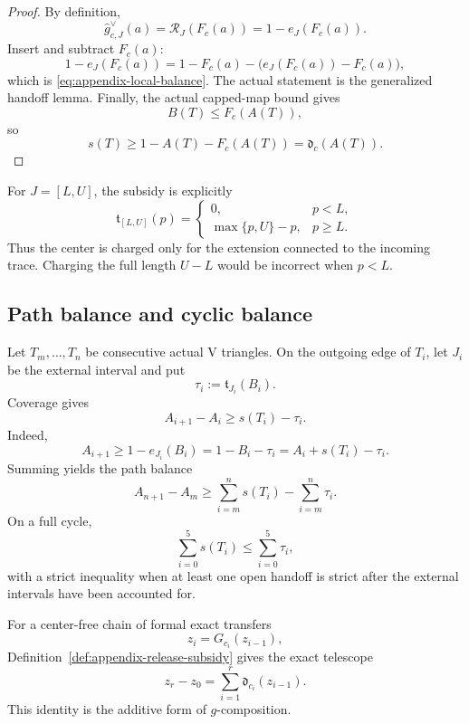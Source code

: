 \begin{proof}
By definition,
\[
 \widehat g_{c,J}^\vee(a)
 =\mathcal R_J(F_c(a))
 =1-e_J(F_c(a)).
\]
Insert and subtract \(F_c(a)\):
\[
 1-e_J(F_c(a))
 =1-F_c(a)-\bigl(e_J(F_c(a))-F_c(a)\bigr),
\]
which is \eqref{eq:appendix-local-balance}.  The actual statement is the
generalized handoff lemma.  Finally, the actual capped-map bound gives
\[
 B(T)\le F_c(A(T)),
\]
so
\[
 s(T)
 \ge1-A(T)-F_c(A(T))
 =\mathfrak d_c(A(T)).
\]
\end{proof}

For \(J=[L,U]\), the subsidy is explicitly
\begin{equation}
 \mathfrak t_{[L,U]}(p)=
 \begin{cases}
 0,&p<L,\\
 \max\{p,U\}-p,&p\ge L.
 \end{cases}
 \label{eq:appendix-subsidy-explicit}
\end{equation}
Thus the center is charged only for the extension connected to the incoming
trace.  Charging the full length \(U-L\) would be incorrect when \(p<L\).

\subsection{Path balance and cyclic balance}

Let \(T_m,\ldots,T_n\) be consecutive actual V triangles.  On the outgoing
edge of \(T_i\), let \(J_i\) be the external interval and put
\[
 \tau_i:=\mathfrak t_{J_i}(B_i).
\]
Coverage gives
\begin{equation}
 A_{i+1}-A_i
 \ge s(T_i)-\tau_i.
 \label{eq:appendix-signed-step}
\end{equation}
Indeed,
\[
 A_{i+1}\ge1-e_{J_i}(B_i)
 =1-B_i-\tau_i
 =A_i+s(T_i)-\tau_i.
\]
Summing yields the path balance
\begin{equation}
 A_{n+1}-A_m
 \ge\sum_{i=m}^n s(T_i)-\sum_{i=m}^n\tau_i.
 \label{eq:appendix-path-balance}
\end{equation}
On a full cycle,
\begin{equation}
 \sum_{i=0}^5s(T_i)
 \le\sum_{i=0}^5\tau_i,
 \label{eq:appendix-cycle-balance}
\end{equation}
with a strict inequality when at least one open handoff is strict after the
external intervals have been accounted for.

For a center-free chain of formal exact transfers
\[
 z_i=G_{c_i}(z_{i-1}),
\]
Definition~\ref{def:appendix-release-subsidy} gives the exact telescope
\begin{equation}
 z_r-z_0
 =\sum_{i=1}^r\mathfrak d_{c_i}(z_{i-1}).
 \label{eq:appendix-exact-telescope}
\end{equation}
This identity is the additive form of \(g\)-composition.

